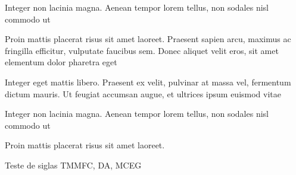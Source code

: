 \begin{alineascomponto}
	\item Integer non lacinia magna. Aenean tempor lorem tellus, non sodales nisl commodo ut
	\item Proin mattis placerat risus sit amet laoreet. Praesent sapien arcu, maximus ac fringilla efficitur, vulputate faucibus sem. Donec aliquet velit eros, sit amet elementum dolor pharetra eget
	\item Integer eget mattis libero. Praesent ex velit, pulvinar at massa vel, fermentum dictum mauris. Ut feugiat accumsan augue, et ultrices ipsum euismod vitae
	\begin{subalineascomponto}
		\item Integer non lacinia magna. Aenean tempor lorem tellus, non sodales nisl commodo ut
		\item Proin mattis placerat risus sit amet laoreet.
	\end{subalineascomponto}
\end{alineascomponto}

Teste de siglas \gls{TMMFC}, \gls{DA}, \gls{MCEG}